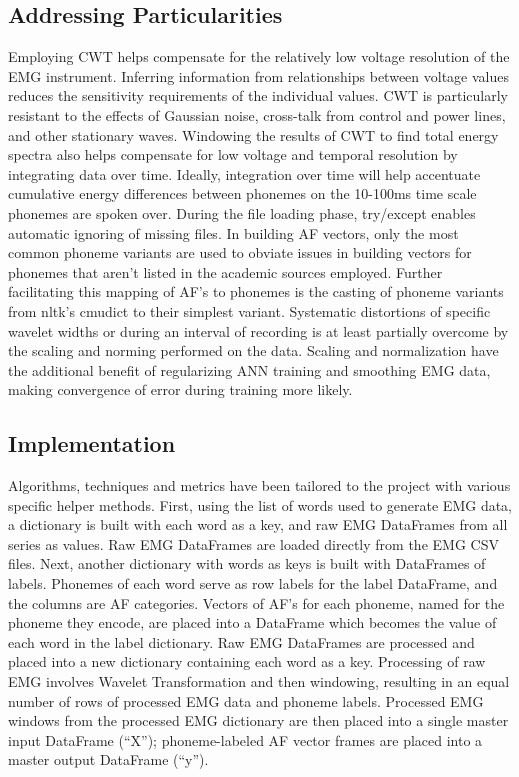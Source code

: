 \documentclass[conference]{IEEEtran}
\begin{document}
\subsection{Addressing Particularities}
Employing CWT helps compensate for the relatively low voltage resolution of the EMG instrument. Inferring information from relationships between voltage values reduces the sensitivity requirements of the individual values. CWT is particularly resistant to the effects of Gaussian noise, cross-talk from control and power lines, and other stationary waves. Windowing the results of CWT to find total energy spectra also helps compensate for low voltage and temporal resolution by integrating data over time. Ideally, integration over time will help accentuate cumulative energy differences between phonemes on the 10-100ms time scale phonemes are spoken over. During the file loading phase, try/except enables automatic ignoring of missing files. In building AF vectors, only the most common phoneme variants are used to obviate issues in building vectors for phonemes that aren't listed in the academic sources employed. Further facilitating this mapping of AF's to phonemes is the casting of phoneme variants from nltk's cmudict to their simplest variant. Systematic distortions of specific wavelet widths or during an interval of recording is at least partially overcome by the scaling and norming performed on the data. Scaling and normalization have the additional benefit of regularizing ANN training and smoothing EMG data, making convergence of error during training more likely.

\subsection{Implementation}
Algorithms, techniques and metrics have been tailored to the project with various specific helper methods. First, using the list of words used to generate EMG data, a dictionary is built with each word as a key, and raw EMG DataFrames from all series as values. Raw EMG DataFrames are loaded directly from the EMG CSV files. Next, another dictionary with words as keys is built with DataFrames of labels. Phonemes of each word serve as row labels for the label DataFrame, and the columns are AF categories. Vectors of AF's for each phoneme, named for the phoneme they encode, are placed into a DataFrame which becomes the value of each word in the label dictionary. Raw EMG DataFrames are processed and placed into a new dictionary containing each word as a key. Processing of raw EMG involves Wavelet Transformation and then windowing, resulting in an equal number of rows of processed EMG data and phoneme labels. Processed EMG windows from the processed EMG dictionary are then placed into a single master input DataFrame (“X”); phoneme-labeled AF vector frames are placed into a master output DataFrame (“y”).
\end{document}
